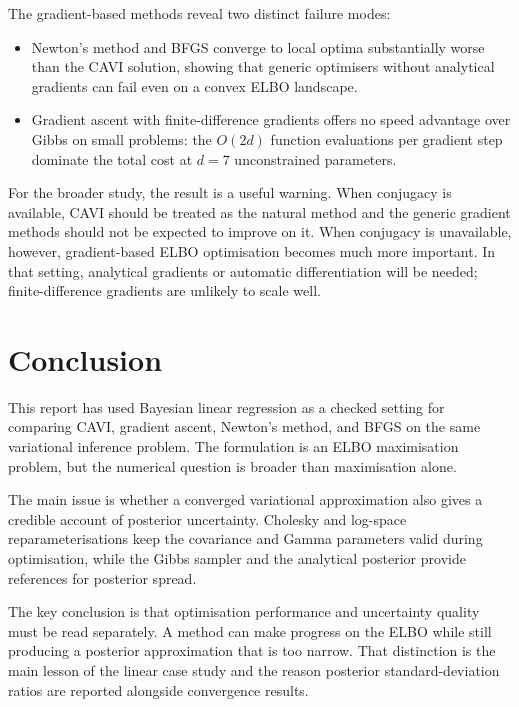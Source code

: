 \documentclass[11pt,a4paper]{article}
\begin{document}
The gradient-based methods reveal two distinct failure modes:
\begin{itemize}
  \item Newton's method and BFGS converge to local optima substantially worse than the CAVI solution, showing that generic optimisers without analytical gradients can fail even on a convex ELBO landscape.
  \item Gradient ascent with finite-difference gradients offers no speed advantage over Gibbs on small problems: the $O(2d)$ function evaluations per gradient step dominate the total cost at $d=7$ unconstrained parameters.
\end{itemize}

For the broader study, the result is a useful warning. When conjugacy is available, CAVI should be treated as the natural method and the generic gradient methods should not be expected to improve on it. When conjugacy is unavailable, however, gradient-based ELBO optimisation becomes much more important. In that setting, analytical gradients or automatic differentiation will be needed; finite-difference gradients are unlikely to scale well.

\section{Conclusion}

This report has used Bayesian linear regression as a checked setting for comparing CAVI, gradient ascent, Newton's method, and BFGS on the same variational inference problem. The formulation is an ELBO maximisation problem, but the numerical question is broader than maximisation alone.

The main issue is whether a converged variational approximation also gives a credible account of posterior uncertainty. Cholesky and log-space reparameterisations keep the covariance and Gamma parameters valid during optimisation, while the Gibbs sampler and the analytical posterior provide references for posterior spread.

The key conclusion is that optimisation performance and uncertainty quality must be read separately. A method can make progress on the ELBO while still producing a posterior approximation that is too narrow. That distinction is the main lesson of the linear case study and the reason posterior standard-deviation ratios are reported alongside convergence results.

\newpage
\nocite{*}
\printbibliography
\setcounter{secnumdepth}{1}
\appendix
\renewcommand{\thesection}{Appendix~\Alph{section}}
\end{document}
